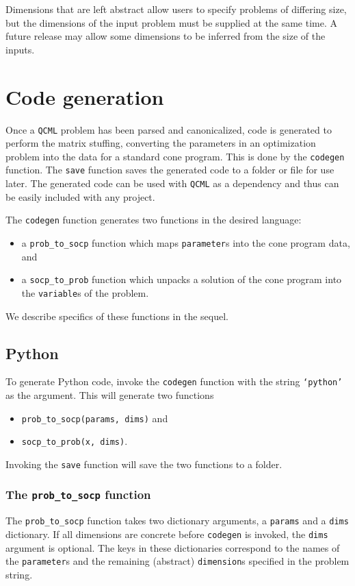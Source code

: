 \documentclass[11pt]{article}
\def\qcml{\texttt{QCML}\xspace}
\begin{document}
Dimensions that are left abstract allow users to specify problems of
differing size, but the dimensions of the input problem must be supplied at
the same time. A future release may allow some dimensions to be inferred from
the size of the inputs.

\section{Code generation}
\label{s-ug-codegen}
Once a \qcml problem has been parsed and canonicalized, code is generated
to perform the matrix stuffing, converting the parameters in an optimization
problem into the data for a standard cone program. This is done by the
{\tt codegen} function. The {\tt save} function saves the generated code to
a folder or file for use later. The generated code can be used with \qcml as
a dependency and thus can be easily included with any project.

The {\tt codegen} function generates two functions in the desired language:
\begin{itemize}
\item a {\tt prob\_to\_socp} function which maps {\tt parameter}s into the cone
program data, and
\item a {\tt socp\_to\_prob} function which unpacks a solution of the cone program
into the {\tt variable}s of the problem.
\end{itemize}
We describe specifics of these functions in the sequel.

\subsection{Python}
To generate Python code, invoke the {\tt codegen} function with the string
{\tt `python'} as the argument. This will generate two functions
\begin{itemize}
\item {\tt prob\_to\_socp(params, dims)} and
\item {\tt socp\_to\_prob(x, dims)}.
\end{itemize}
Invoking the {\tt save} function will save the two functions to a folder.

\subsubsection{The {\tt prob\_to\_socp} function}
The {\tt prob\_to\_socp} function takes two dictionary
arguments, a {\tt params} and a {\tt dims} dictionary. If all dimensions are
concrete before {\tt codegen} is invoked, the {\tt dims} argument is optional.
The keys in these
dictionaries correspond to the names of the {\tt parameter}s and the 
remaining (abstract)
{\tt dimension}s specified in the problem string.
\end{document}
